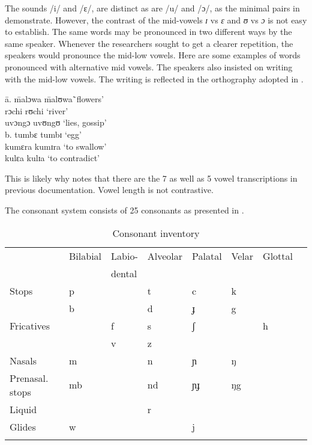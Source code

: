 \documentclass[output=paper,colorlinks,citecolor=brown]{langscibook}
\begin{document}
The sounds /i/ and /ɛ/, are distinct as are /u/ and /ɔ/, as the minimal pairs  in  demonstrate. However, the contrast of the mid-vowels  \textit{ɪ} vs \textit{ɛ} and \textit{ʊ} vs \textit{ɔ} is not  easy to establish. The  same words may be pronounced  in two different ways by the same speaker. Whenever  the researchers sought  to get a clearer  repetition,  the speakers would  pronounce  the mid-low vowels. Here are some examples of words pronounced with alternative mid vowels. The  speakers also insisted  on writing  with  the mid-low vowels. The writing  is reflected  in the orthography adopted in \cite{RugemaliraEtAl2019}.

\ea%
    \label{ex:ngonyani:2}
    \begin{tabbing}
        \= a. \quad\= malɔwa \quad\= malʊwa\quad\= `flowers'\\
        \> \> rɔchi \> rʊchi  \>  `river' \\
        \> \> uvɔngɔ \> uvʊngʊ \> `lies, gossip'\\
        \> b. \>  tumbɛ \> tumbɪ \> `egg' \\
        \> \> kumɛra \> kumɪra \> `to swallow'\\
        \> \> kulɛa \> kulɪa \> `to contradict'
    \end{tabbing}
\z

This is likely why \cite{Nurse2000} notes that there are the 7 as well as 5 vowel transcriptions in previous documentation. Vowel length is not contrastive.

The consonant system consists of 25 consonants as presented in . 

\begin{table}
	\caption {Consonant inventory \citep[5]{RugemaliraEtAl2019} }
 	\label{tab:ngonyani:2}
    \begin{tabular}{llllllll}
    \lsptoprule 
        & Bilabial & Labio-  & Alveolar & Palatal & Velar & Glottal\\
        & & dental\\
    \midrule
        Stops & p & & t & c & k\\
        & b &  &   d & ɟ & g\\
        Fricatives & & f &   s & ʃ & & h\\
        & & v &   z\\
        Nasals & m & &    n & ɲ & ŋ\\
        Prenasal. stops & mb & &  nd & ɲɟ & ŋg \\
        Liquid & & &    r\\
        Glides & w & &    & j\\
    \lspbottomrule
    \end{tabular}
\end{table}
\end{document}

